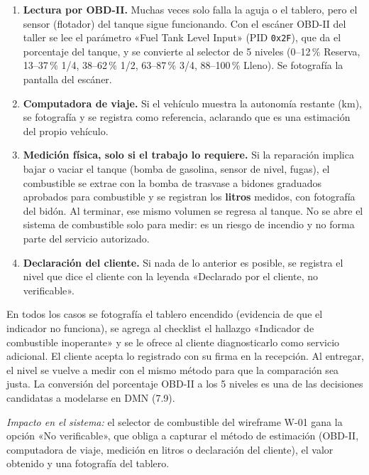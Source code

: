 \begin{enumerate}
\tightlist
\item \textbf{Lectura por OBD-II.} Muchas veces solo falla la aguja o el
tablero, pero el sensor (flotador) del tanque sigue funcionando. Con el
escáner OBD-II del taller se lee el parámetro «Fuel Tank Level Input» (PID
\texttt{0x2F}), que da el porcentaje del tanque, y se convierte al selector
de 5 niveles (0--12\,\% Reserva, 13--37\,\% 1/4, 38--62\,\% 1/2,
63--87\,\% 3/4, 88--100\,\% Lleno). Se fotografía la pantalla del escáner.
\item \textbf{Computadora de viaje.} Si el vehículo muestra la autonomía
restante (km), se fotografía y se registra como referencia, aclarando que
es una estimación del propio vehículo.
\item \textbf{Medición física, solo si el trabajo lo requiere.} Si la
reparación implica bajar o vaciar el tanque (bomba de gasolina, sensor de
nivel, fugas), el combustible se extrae con la bomba de trasvase a bidones
graduados aprobados para combustible y se registran los \textbf{litros}
medidos, con fotografía del bidón. Al terminar, ese mismo volumen se
regresa al tanque. No se abre el sistema de combustible solo para medir:
es un riesgo de incendio y no forma parte del servicio autorizado.
\item \textbf{Declaración del cliente.} Si nada de lo anterior es posible,
se registra el nivel que dice el cliente con la leyenda «Declarado por el
cliente, no verificable».
\end{enumerate}

En todos los casos se fotografía el tablero encendido (evidencia de que el
indicador no funciona), se agrega al checklist el hallazgo «Indicador de
combustible inoperante» y se le ofrece al cliente diagnosticarlo como
servicio adicional. El cliente acepta lo registrado con su firma en la
recepción. Al entregar, el nivel se vuelve a medir con el mismo método para
que la comparación sea justa. La conversión del porcentaje OBD-II a los 5
niveles es una de las decisiones candidatas a modelarse en DMN (7.9).

\emph{Impacto en el sistema:} el selector de combustible del wireframe W-01
gana la opción «No verificable», que obliga a capturar el método de
estimación (OBD-II, computadora de viaje, medición en litros o declaración
del cliente), el valor obtenido y una fotografía del tablero.

